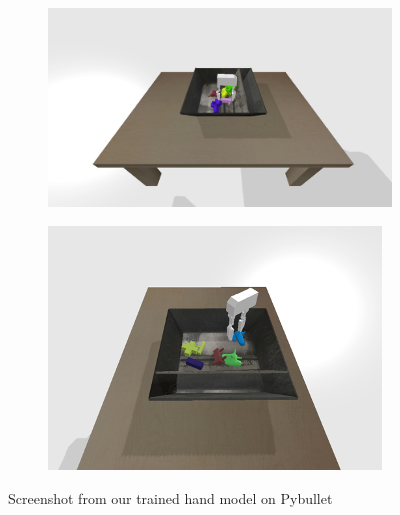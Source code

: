 \begin{figure}

    \begin{subfigure}{0.49\textwidth}
      \includegraphics[width=\linewidth]{figures/PybulletEnv1.png}
      \caption{} \label{fig:1a}
    \end{subfigure}%
    \hspace*{\fill}   %
    \begin{subfigure}{0.49\textwidth}
      \includegraphics[width=\linewidth]{figures/PybulletEnv2.png}
      \caption{} \label{fig:1b}
    \end{subfigure}%

\caption{Screenshot from our trained hand model on Pybullet \label{fig:gripperbullet}}
\end{figure}
